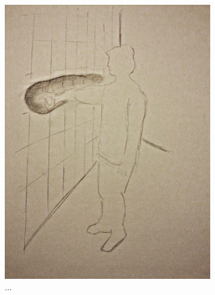 \begin{figure}[h]
  \centering
  \begin{subfigure}[t]{.44\textwidth}
    \centering
    \includegraphics[width=\linewidth]{figures/jamming/concepts/impro/carve}
    \caption{...}
  \end{subfigure}%
  \hspace{0.02\textwidth}
  \begin{subfigure}[t]{.44\textwidth}
    \centering

\end{subfigure}
\end{figure}
